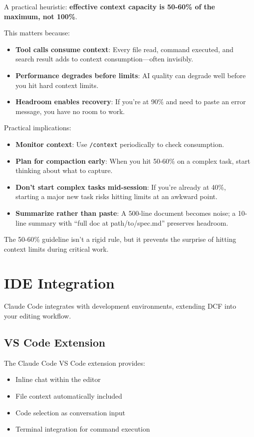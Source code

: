 A practical heuristic: \textbf{effective context capacity is 50-60\% of the maximum, not 100\%}.

This matters because:
\begin{itemize}
    \item \textbf{Tool calls consume context}: Every file read, command executed, and search result adds to context consumption---often invisibly.
    \item \textbf{Performance degrades before limits}: AI quality can degrade well before you hit hard context limits.
    \item \textbf{Headroom enables recovery}: If you're at 90\% and need to paste an error message, you have no room to work.
\end{itemize}

Practical implications:
\begin{itemize}
    \item \textbf{Monitor context}: Use \texttt{/context} periodically to check consumption.
    \item \textbf{Plan for compaction early}: When you hit 50-60\% on a complex task, start thinking about what to capture.
    \item \textbf{Don't start complex tasks mid-session}: If you're already at 40\%, starting a major new task risks hitting limits at an awkward point.
    \item \textbf{Summarize rather than paste}: A 500-line document becomes noise; a 10-line summary with ``full doc at path/to/spec.md'' preserves headroom.
\end{itemize}

The 50-60\% guideline isn't a rigid rule, but it prevents the surprise of hitting context limits during critical work.

\section{IDE Integration}

Claude Code integrates with development environments, extending DCF into your editing workflow.

\subsection{VS Code Extension}

The Claude Code VS Code extension provides:
\begin{itemize}
    \item Inline chat within the editor
    \item File context automatically included
    \item Code selection as conversation input
    \item Terminal integration for command execution
\end{itemize}

